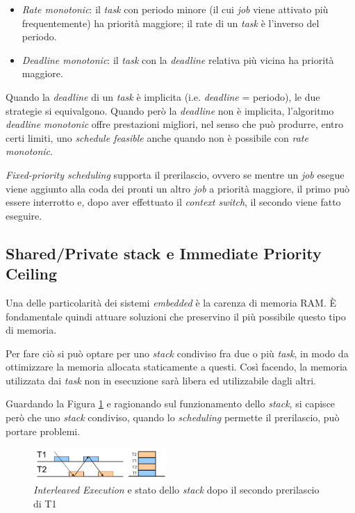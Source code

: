 \documentclass{article}
\begin{document}
\begin{itemize}
	\item \textit{Rate monotonic}: il \textit{task} con periodo minore (il cui \textit{job} viene attivato più frequentemente) ha priorità maggiore; il rate di un \textit{task} è l'inverso del periodo.
	\item \textit{Deadline monotonic}: il \textit{task} con la \textit{deadline} relativa più vicina ha priorità maggiore.
\end{itemize}

Quando la \textit{deadline} di un \textit{task} è implicita (i.e. \textit{deadline} = periodo), le due strategie si equivalgono. Quando però la \textit{deadline} non è implicita, l'algoritmo \textit{deadline monotonic} offre prestazioni migliori, nel senso che può produrre, entro certi limiti, uno \textit{schedule feasible} anche quando non è possibile con \textit{rate monotonic}.

\textit{Fixed-priority scheduling} supporta il prerilascio, ovvero se mentre un \textit{job} esegue viene aggiunto alla coda dei pronti un altro \textit{job} a priorità maggiore, il primo può essere interrotto e, dopo aver effettuato il \textit{context switch}, il secondo viene fatto eseguire.

\subsection{Shared/Private stack e Immediate Priority Ceiling}
Una delle particolarità dei sistemi \textit{embedded} è la carenza di memoria RAM. È fondamentale quindi attuare soluzioni che preservino il più possibile questo tipo di memoria.

Per fare ciò si può optare per uno \textit{stack} condiviso fra due o più \textit{task}, in modo da ottimizzare la memoria allocata staticamente a questi. Così facendo, la memoria utilizzata dai \textit{task} non in esecuzione sarà libera ed utilizzabile dagli altri.

Guardando la Figura \ref{interlived-execution} e ragionando sul funzionamento dello \textit{stack}, si capisce però che uno \textit{stack} condiviso, quando lo \textit{scheduling} permette il prerilascio, può portare problemi. 

\begin{figure}[!htbp]
	\centering
	\includegraphics[width=2in]{image/Interleaved_execution-stack.png}
	\caption{\textit{Interleaved Execution} e stato dello \textit{stack} dopo il secondo prerilascio di T1}
	\label{interlived-execution}
\end{figure}
\end{document}
